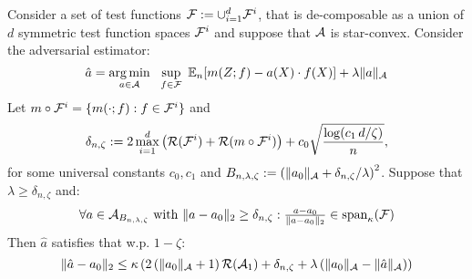 \begin{theorem}\label{thm:reg-main-error-2}
Consider a set of test functions ${\mathcal F}:=\cup_{i=1}^d {\mathcal F}^i$, that is de-composable as a union of $d$ symmetric test function spaces ${\mathcal F}^i$ and suppose that ${\mathcal A}$ is star-convex. Consider the adversarial estimator:
\begin{equation}\label{eqn:reg-estimator-2}
    \hat{a} = 
    \operatorname*{arg\,min}_{a\in {\mathcal A}} \,\,\,\,\sup_{f\in {\mathcal F}}\,\, \mathbb{E}_n[m(Z; f) - a(X)\cdot f(X)] + \lambda \|a\|_{{\mathcal A}}
\end{equation}
Let $m\circ {\mathcal F}^i = \{m(\cdot; f): f\in {\mathcal F}^i\}$ and
\[
\delta_{n,\zeta}:=2\max_{i=1}^d \left({\mathcal R}({\mathcal F}^i) + {\mathcal R}(m\circ {\mathcal F}^i)\right) + c_0 \sqrt{\frac{\log(c_1\, d/\zeta)}{n}},
\]
for some universal constants $c_0, c_1$ and $B_{n,\lambda,\zeta}:= \left(\|a_0\|_{{\mathcal A}} + \delta_{n,\zeta}/\lambda\right)^2$. Suppose that $\lambda\geq \delta_{n,\zeta}$ and:
\begin{equation}\label{cond:normalized-span}
\textstyle{\forall a\in {\mathcal A}_{B_{n,\lambda,\zeta}} \text{ with } \|a-a_0\|_2\geq \delta_{n,\zeta}: \frac{a - a_0}{\|a-a_0\|_2} \in \ensuremath{\text{span}}_{\kappa}({\mathcal F})}
\end{equation}
Then $\hat{a}$ satisfies that w.p. $1-\zeta$:
\begin{equation}
    \|\hat{a}-a_0\|_2 \leq \kappa \left( 2\left(\|a_0\|_{{\mathcal A}}+1\right) {\mathcal R}({\mathcal A}_1) + \delta_{n,\zeta} + \lambda \left(\|a_0\|_{{\mathcal A}}-\|\hat{a}\|_{{\mathcal A}}\right)\right)
\end{equation}
\end{theorem}




